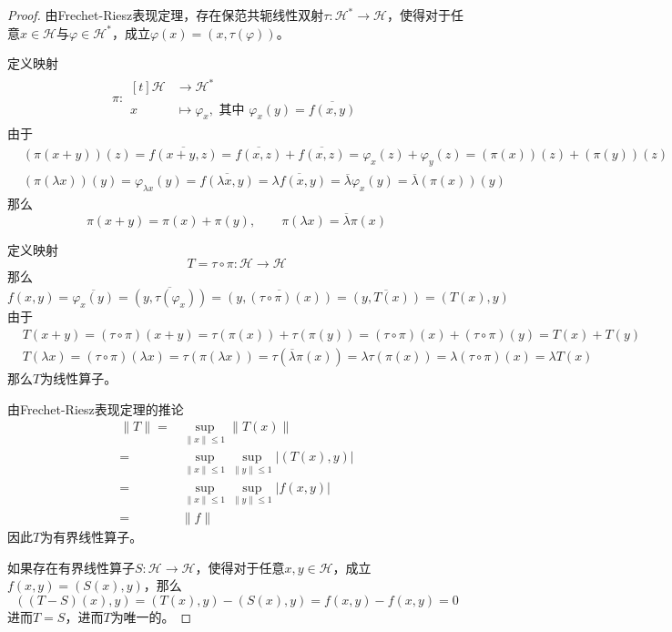 \documentclass[lang = cn, scheme = chinese]{elegantbook}
\begin{document}
\begin{proof}
	由Frechet-Riesz表现定理，存在保范共轭线性双射$\tau:\mathcal{H}^*\to \mathcal{H}$，使得对于任意$x\in\mathcal{H}$与$\varphi\in \mathcal{H}^*$，成立$\varphi(x)=(x,\tau(\varphi))$。
	
	定义映射
	\begin{align*}
		\pi:\begin{aligned}[t]
			\mathcal{H}&\longrightarrow \mathcal{H}^*\\
			x&\longmapsto \varphi_x,\text{ 其中 }\varphi_x(y)=\overline{f(x,y)}
		\end{aligned}
	\end{align*}
	由于
	\begin{align*}
		&(\pi(x+y))(z)=\overline{f(x+y,z)}=\overline{f(x,z)}+\overline{f(x,z)}=\varphi_{x}(z)+\varphi_{y}(z)=(\pi(x))(z)+(\pi(y))(z)\\
		&(\pi(\lambda x))(y)=\varphi_{\lambda x}(y)=\overline{f(\lambda x,y)}=\overline{\lambda f(x,y)}=\overline{\lambda}\varphi_{x}(y)=\overline{\lambda}(\pi(x))(y)
	\end{align*}
	那么
	$$
	\pi(x+y)=\pi(x)+\pi(y),\qquad 
	\pi(\lambda x)=\overline{\lambda}\pi(x)
	$$
	
	定义映射
	$$
	T=\tau\circ \pi:\mathcal{H}\to \mathcal{H}
	$$
	那么
	$$
	f(x,y)=\overline{\varphi_x(y)}=\overline{(y,\tau(\varphi_x))}=\overline{(y,(\tau\circ \pi)(x))}=\overline{(y,T(x))}=(T(x),y)
	$$
	由于
	\begin{align*}
		&T(x+y)=(\tau\circ \pi)(x+y)=\tau(\pi(x))+\tau(\pi(y))=(\tau\circ \pi)(x)+(\tau\circ \pi)(y)=T(x)+T(y)\\
		&T(\lambda x)=(\tau\circ \pi)(\lambda x)=\tau(\pi(\lambda x))=\tau(\overline{\lambda }\pi(x))=\lambda \tau(\pi(x))=\lambda (\tau\circ \pi)(x)=\lambda T(x)
	\end{align*}
	那么$T$为线性算子。
	
	由Frechet-Riesz表现定理的推论
	\begin{align*}
		\|T\| = & \sup_{\|x\|\le 1}\|T(x)\|\\
		= & \sup_{\|x\|\le 1}\sup_{\|y\|\le 1}|(T(x),y)|\\
		= & \sup_{\|x\|\le 1}\sup_{\|y\|\le 1}|f(x,y)|\\
		= & \|f\|
	\end{align*}
	因此$T$为有界线性算子。
	
	如果存在有界线性算子$S:\mathcal{H}\to\mathcal{H}$，使得对于任意$x,y\in \mathcal{H}$，成立$f(x,y)=(S(x),y)$，那么
	$$
	((T-S)(x),y)=(T(x),y)-(S(x),y)=f(x,y)-f(x,y)=0
	$$
	进而$T=S$，进而$T$为唯一的。
\end{proof}
\end{document}
